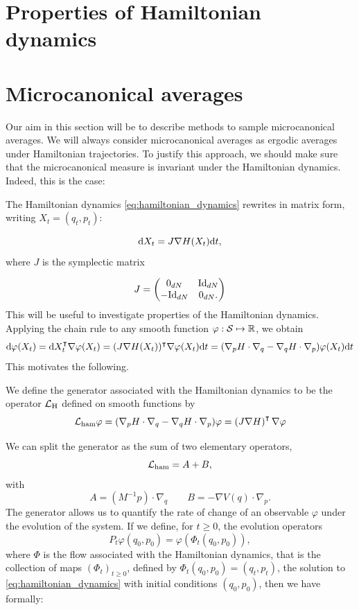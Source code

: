 \section{Properties of Hamiltonian dynamics}



\section{Microcanonical averages}
Our aim in this section will be to describe methods to sample microcanonical averages. We will always consider microcanonical averages as ergodic averages under Hamiltonian trajectories.
To justify this approach, we should make sure that the microcanonical measure is invariant under the Hamiltonian dynamics. Indeed, this is the case:

The Hamiltonian dynamics \eqref{eq:hamiltonian_dynamics} rewrites in matrix form, writing $X_t=(q_t,p_t)$:

\begin{equation}\label{eq:hamiltonian_dynamics_matrix_form} \text d X_t=J\nabla H(X_t)\mathrm{d}t,\end{equation}
where $J$ is the symplectic matrix

$$J = \begin{pmatrix}
    0_{dN} & \mathrm{Id}_{dN}\\ -\mathrm{Id}_{dN} & 0_{dN}.
\end{pmatrix}$$
This will be useful to investigate properties of the Hamiltonian dynamics.
Applying the chain rule to any smooth function $\varphi: \mathcal{S} \mapsto \mathbb{R}$, we obtain
        $$ \text d \varphi(X_t)= \text d X_t^{\intercal} \nabla \varphi(X_t)=(J \nabla H(X_t))^\intercal \nabla \varphi(X_t)\mathrm{d}t=(\nabla_p H \cdot \nabla_q - \nabla_q H \cdot \nabla_p)\varphi(X_t)\mathrm{d}t$$
        This motivates the following.
        \begin{definition}
            We define the generator associated with the Hamiltonian dynamics to be the operator $\mathcal{L}_{\text{H}}$ defined on smooth functions by
        \begin{equation}
            \label{eq:hamiltonian_generator}
            \mathcal{L}_{\mathrm{ham}}\varphi=(\nabla_p H \cdot \nabla_q - \nabla_q H \cdot \nabla_p)\varphi=\left(J\nabla H\right)^\intercal \nabla \varphi
        \end{equation}
    \end{definition}
    We can split the generator as the sum of two elementary operators,
    $$\mathcal{L}_{\rm ham}=A+B,$$
    with
    \begin{equation}
        \label{eq:Lham_splitting}
        A=\left(M^{-1}p\right)\cdot \nabla_q \qquad B=-\nabla V(q)\cdot \nabla_p.
    \end{equation}
    The generator allows us to quantify the rate of change of an observable $\varphi$ under the evolution of the system. If we define, for $t\geq 0$, the evolution operators 
    $$P_t \varphi (q_0,p_0) = \varphi(\Phi_t(q_0,p_0)),$$
where $\Phi$ is the flow associated with the Hamiltonian dynamics, that is the collection of maps $(\Phi_t)_{t\geq 0}$, defined by
    $\Phi_t (q_0,p_0) = (q_t,p_t)$, the solution to \eqref{eq:hamiltonian_dynamics} with initial conditions  $(q_0,p_0)$, then we have formally:

